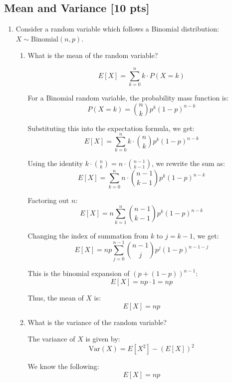 \documentclass[letter]{article}
\theoremstyle{definition}
\newcommand{\Var}{\mathrm{Var}}
\newenvironment{soln}{
	\leavevmode\color{black}\ignorespaces
}{}
\begin{document}
	\subsection{Mean and Variance [10 pts]}
	\begin{enumerate}
		\item Consider a random variable which follows a Binomial
		distribution: $X \sim \text{Binomial}(n, p)$.
		\begin{enumerate}
			\item What is the mean of the random variable?\\
			
                \begin{soln}
				\[
				E[X] = \sum_{k=0}^{n} k \cdot P(X = k)
				\]
				
				For a Binomial random variable, the probability mass function is:
				\[
				P(X = k) = \binom{n}{k} p^k (1 - p)^{n - k}
				\]
				
				Substituting this into the expectation formula, we get:
				\[
				E[X] = \sum_{k=0}^{n} k \cdot \binom{n}{k} p^k (1 - p)^{n - k}
				\]
				
				Using the identity \( k \cdot \binom{n}{k} = n \cdot \binom{n - 1}{k - 1} \), we rewrite the sum as:
				\[
				E[X] = \sum_{k=0}^{n} n \cdot \binom{n - 1}{k - 1} p^k (1 - p)^{n - k}
				\]
				
				Factoring out \( n \):
				\[
				E[X] = n \sum_{k=1}^{n} \binom{n - 1}{k - 1} p^k (1 - p)^{n - k}
				\]
				
				Changing the index of summation from \( k \) to \( j = k - 1 \), we get:
				\[
				E[X] = n p \sum_{j=0}^{n - 1} \binom{n - 1}{j} p^j (1 - p)^{n - 1 - j}
				\]
				
				This is the binomial expansion of \( (p + (1 - p))^{n - 1} \):
				\[
				E[X] = n p \cdot 1 = np
				\]
				
				Thus, the mean of \( X \) is:
				\[
				E[X] = np
				\]
			\end{soln}
			\item What is the variance of the random variable?\\
			
                \begin{soln}
                The variance of $X$ is given by:
                \[
                \Var(X) = E[X^2] - (E[X])^2
                \]
                
                We know the following:
                \[
                E[X] = np
                \]
                

\end{soln}
\end{enumerate}
\end{enumerate}
\end{document}
